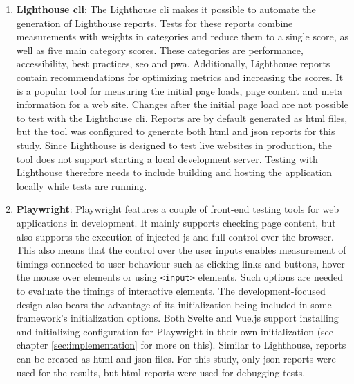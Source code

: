 \documentclass[a4paper, 10pt]{article}
\begin{document}
\begin{enumerate}
  \item \textbf{Lighthouse \acrshort{cli}}: The Lighthouse \acrshort{cli} makes it possible to automate the generation of Lighthouse reports.
  Tests for these reports combine measurements with weights in categories and reduce them to a single score, as well as five main category scores.
  These categories are performance, accessibility, best practices, \acrshort{seo} and \acrshort{pwa}.
  Additionally, Lighthouse reports contain recommendations for optimizing metrics and increasing the scores.
  It is a popular tool for measuring the initial page loads, page content and meta information for a web site.
  Changes after the initial page load are not possible to test with the Lighthouse \acrshort{cli}.
  Reports are by default generated as \acrshort{html} files, but the tool was configured to generate both \acrshort{html} and \acrshort{json} reports for this study.
  Since Lighthouse is designed to test live websites in production, the tool does not support starting a local development server.
  Testing with Lighthouse therefore needs to include building and hosting the application locally while tests are running.
  \item \textbf{Playwright}: Playwright features a couple of front-end testing tools for web applications in development.
  It mainly supports checking page content, but also supports the execution of injected \acrlong{js} and full control over the browser.
  This also means that the control over the user inputs enables measurement of timings connected to user behaviour such as clicking links and buttons, hover the mouse over elements or using \verb|<input>| elements.
  Such options are needed to evaluate the timings of interactive elements.
  The development-focused design also bears the advantage of its initialization being included in some framework's initialization options.
  Both Svelte and Vue.js support installing and initializing configuration for Playwright in their own initialization (see chapter \ref{sec:implementation} for more on this).
  Similar to Lighthouse, reports can be created as \acrshort{html} and \acrshort{json} files.
  For this study, only \acrshort{json} reports were used for the results, but \acrshort{html} reports were used for debugging tests.
\end{enumerate}
\end{document}

